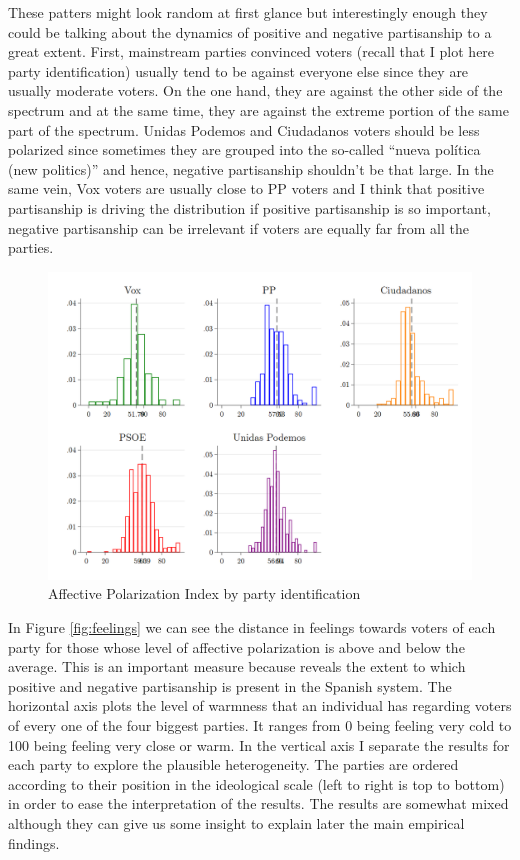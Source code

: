 \documentclass[a4paper, svgnames]{article}
\begin{document}
These patters might look random at first glance but interestingly enough they could be talking about the dynamics of positive and negative partisanship to a great extent. First, mainstream parties convinced voters (recall that I plot here party identification) usually tend to be against everyone else since they are usually moderate voters. On the one hand, they are against the other side of the spectrum and at the same time, they are against the extreme portion of the same part of the spectrum. Unidas Podemos and Ciudadanos voters should be less polarized since sometimes they are grouped into the so-called ``nueva política (new politics)'' and hence, negative partisanship shouldn't be that large. In the same vein, Vox voters are usually close to PP voters and I think that positive partisanship is driving the distribution if positive partisanship is so important, negative partisanship can be irrelevant if voters are equally far from all the parties.

\begin{figure}[H]
	\centering
	\includegraphics[scale=0.30]{Figures/AP_index_by_party_id.png}
	\caption{\label{fig:AP_party_id} Affective Polarization Index by party identification}
\end{figure}

In Figure \ref*{fig:feelings} we can see the distance in feelings towards voters of each party for those whose level of affective polarization is above and below the average. This is an important measure because reveals the extent to which positive and negative partisanship is present in the Spanish system. The horizontal axis plots the level of warmness that an individual has regarding voters of every one of the four biggest parties. It ranges from 0 being feeling very cold to 100 being feeling very close or warm. In the vertical axis I separate the results for each party to explore the plausible heterogeneity. The parties are ordered according to their position in the ideological scale (left to right is top to bottom) in order to ease the interpretation of the results. The results are somewhat mixed although they can give us some insight to explain later the main empirical findings.
\end{document}
